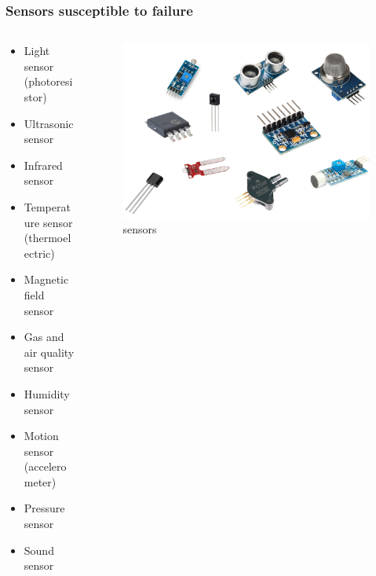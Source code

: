 \documentclass{beamer}
\begin{document}
\begin{frame}
    \frametitle{Sensors susceptible to failure}
    \begin{columns}

        \begin{column}{0.4\textwidth}
            \footnotesize
            \begin{itemize}
                \item Light sensor (photoresistor)
                \item Ultrasonic sensor
                \item Infrared sensor
                \item Temperature sensor (thermoelectric)
                \item Magnetic field sensor
                \item Gas and air quality sensor
                \item Humidity sensor
                \item Motion sensor (accelerometer)
                \item Pressure sensor
                \item Sound sensor
            \end{itemize}
        \end{column}
        
        \begin{column}{0.6\textwidth}
            \begin{figure}
                \centering
                \includegraphics[width=1\textwidth]{images/graphics/sensors.png}
                \caption{sensors}
            \end{figure}
        \end{column}

    \end{columns}
\end{frame}
\end{document}
